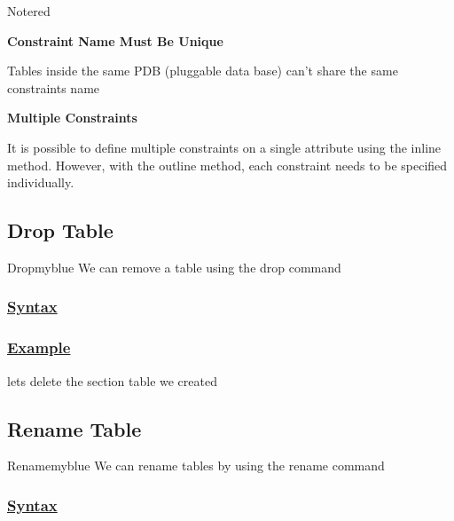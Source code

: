 \begin{prettyBox}{Note}{red}

\textbf{Constraint Name Must Be Unique}

\vspace{0.15cm}
Tables inside the same PDB (pluggable data base) can't share the same constraints name

\vspace{0.25cm}
\textbf{Multiple Constraints}

\vspace{0.15cm}
It is possible to define multiple constraints on a single attribute using the inline method. 
However, with the outline method, each constraint needs to be specified individually.

\end{prettyBox}


\subsection{Drop Table}
\begin{prettyBox}{Drop}{myblue}
    We can remove a table using the drop command
\end{prettyBox}

\subsubsection*{\underline{Syntax}}



\subsubsection*{\underline{Example}}
lets delete the section table we created 



\subsection{Rename Table}

\begin{prettyBox}{Rename}{myblue}
We can rename tables by using the rename command 
\end{prettyBox}

\subsubsection*{\underline{Syntax}}

